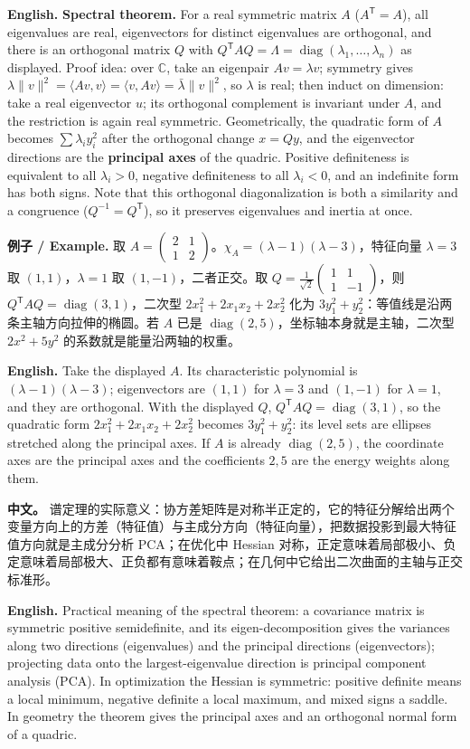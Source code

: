 \documentclass[UTF8,11pt,a4paper]{ctexart}
\newcommand{\EN}[1]{\par\noindent\textbf{English.} #1\par}
\newcommand{\EX}[2]{\par\noindent\textbf{例子 / Example.} #1\par\EN{#2}}
\newcommand{\APS}[2]{\par\noindent\textbf{中文。} #1\par\noindent\textbf{English.} #2\par\smallskip}
\begin{document}
\EN{\textbf{Spectral theorem.} For a real symmetric matrix $A$ ($A^{\mathsf T}=A$), all eigenvalues are real, eigenvectors for distinct eigenvalues are orthogonal, and there is an orthogonal matrix $Q$ with $Q^{\mathsf T}AQ=\Lambda=\operatorname{diag}(\lambda_1,\dots,\lambda_n)$ as displayed. Proof idea: over $\mathbb C$, take an eigenpair $Av=\lambda v$; symmetry gives $\lambda\|v\|^2=\langle Av,v\rangle=\langle v,Av\rangle=\bar\lambda\|v\|^2$, so $\lambda$ is real; then induct on dimension: take a real eigenvector $u$; its orthogonal complement is invariant under $A$, and the restriction is again real symmetric. Geometrically, the quadratic form of $A$ becomes $\sum\lambda_iy_i^2$ after the orthogonal change $x=Qy$, and the eigenvector directions are the \textbf{principal axes} of the quadric. Positive definiteness is equivalent to all $\lambda_i>0$, negative definiteness to all $\lambda_i<0$, and an indefinite form has both signs. Note that this orthogonal diagonalization is both a similarity and a congruence ($Q^{-1}=Q^{\mathsf T}$), so it preserves eigenvalues and inertia at once.}
\EX{取 $A=\begin{pmatrix}2&1\\1&2\end{pmatrix}$。$\chi_A=(\lambda-1)(\lambda-3)$，特征向量 $\lambda=3$ 取 $(1,1)$，$\lambda=1$ 取 $(1,-1)$，二者正交。取 $Q=\frac1{\sqrt2}\begin{pmatrix}1&1\\1&-1\end{pmatrix}$，则 $Q^{\mathsf T}AQ=\operatorname{diag}(3,1)$，二次型 $2x_1^2+2x_1x_2+2x_2^2$ 化为 $3y_1^2+y_2^2$：等值线是沿两条主轴方向拉伸的椭圆。若 $A$ 已是 $\operatorname{diag}(2,5)$，坐标轴本身就是主轴，二次型 $2x^2+5y^2$ 的系数就是能量沿两轴的权重。}{Take the displayed $A$. Its characteristic polynomial is $(\lambda-1)(\lambda-3)$; eigenvectors are $(1,1)$ for $\lambda=3$ and $(1,-1)$ for $\lambda=1$, and they are orthogonal. With the displayed $Q$, $Q^{\mathsf T}AQ=\operatorname{diag}(3,1)$, so the quadratic form $2x_1^2+2x_1x_2+2x_2^2$ becomes $3y_1^2+y_2^2$: its level sets are ellipses stretched along the principal axes. If $A$ is already $\operatorname{diag}(2,5)$, the coordinate axes are the principal axes and the coefficients $2,5$ are the energy weights along them.}
\APS{谱定理的实际意义：协方差矩阵是对称半正定的，它的特征分解给出两个变量方向上的方差（特征值）与主成分方向（特征向量），把数据投影到最大特征值方向就是主成分分析 PCA；在优化中 Hessian 对称，正定意味着局部极小、负定意味着局部极大、正负都有意味着鞍点；在几何中它给出二次曲面的主轴与正交标准形。}{Practical meaning of the spectral theorem: a covariance matrix is symmetric positive semidefinite, and its eigen-decomposition gives the variances along two directions (eigenvalues) and the principal directions (eigenvectors); projecting data onto the largest-eigenvalue direction is principal component analysis (PCA). In optimization the Hessian is symmetric: positive definite means a local minimum, negative definite a local maximum, and mixed signs a saddle. In geometry the theorem gives the principal axes and an orthogonal normal form of a quadric.}
\end{document}
